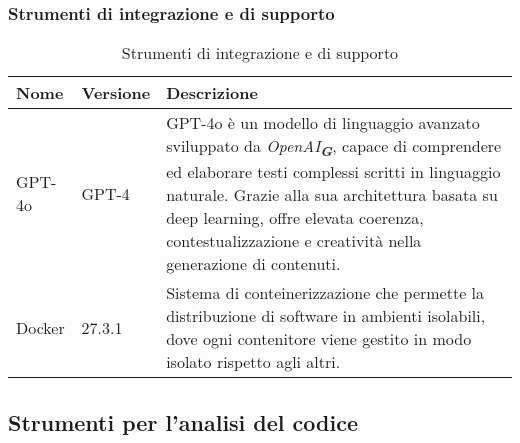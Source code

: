 \subsubsection{Strumenti di integrazione e di supporto}
\label{subsec:strumenti_integrazione_supporto}

\newpage

\begin{table}[h!]
    \centering
    \renewcommand{\arraystretch}{1.6} %
    \begin{tabularx}{\textwidth}{|p{2cm}|p{2cm}|X|} \hline
    \rowcolor[HTML]{FFD700} 
    \textbf{Nome} & \textbf{Versione} & \textbf{Descrizione} \\ 
    \hline
    GPT-4o & GPT-4 & GPT-4o è un modello di linguaggio avanzato sviluppato da \emph{OpenAI}\textsubscript{\textbf{\textit{G}}}, capace di comprendere ed elaborare testi complessi scritti in linguaggio naturale. 
    Grazie alla sua architettura basata su deep learning, offre elevata coerenza, contestualizzazione e creatività nella generazione di contenuti. \\ \hline
    Docker & 27.3.1 & Sistema di conteinerizzazione che permette la distribuzione
    di software in ambienti isolabili, dove ogni contenitore
    viene gestito in modo isolato rispetto agli altri. \\ 
    \hline
    \end{tabularx}
    \caption{Strumenti di integrazione e di supporto}
\end{table}

\subsection{Strumenti per l’analisi del codice}

